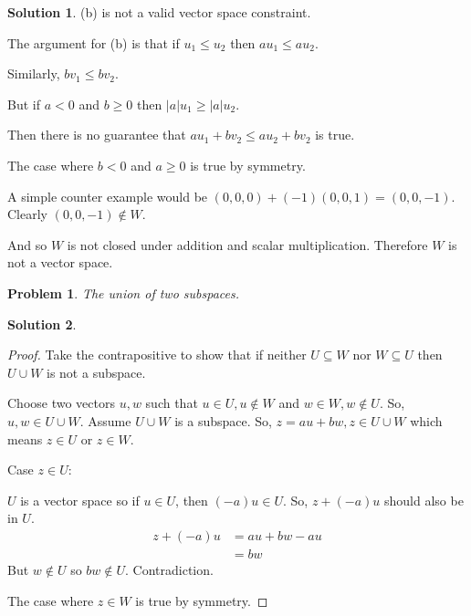\documentclass{article}
\newtheorem{problem}{Problem}
\theoremstyle{definition}
\newtheorem*{solution}{Solution}
\begin{document}
\begin{solution}
(b) is not a valid vector space constraint.

The argument for (b) is that if $u_1\leq u_2$ then $au_1\leq au_2$.

Similarly, $bv_1\leq bv_2$.

But if $a<0$ and $b\geq 0$ then $|a|u_1\geq |a|u_2$.

Then there is no guarantee that $au_1+bv_2\leq au_2+bv_2$ is true.

The case where $b<0$ and $a\geq 0$ is true by symmetry.

A simple counter example would be $(0,0,0)+(-1)(0,0,1)=(0,0,-1)$.
Clearly $(0,0,-1)\notin W$.

And so $W$ is not closed under addition and scalar multiplication.
Therefore $W$ is not a vector space.

\end{solution}

\begin{problem} 

The union of two subspaces.

\end{problem}

\begin{solution}

\begin{proof}
Take the contrapositive to show that if neither $U\subseteq W$ nor $W\subseteq U$ then $U\cup W$ is not a subspace.

Choose two vectors $u,w$ such that $u\in U, u\notin W$ and $w\in W, w\notin U$.
So, $u,w\in U\cup W$.
Assume $U\cup W$ is a subspace.
So, $z=au+bw, z\in U\cup W$ which means $z\in U$ or $z\in W$.

Case $z\in U$:

$U$ is a vector space so if $u\in U$, then $(-a)u\in U$.
So, $z+(-a)u$ should also be in $U$.
\begin{align*}
z+(-a)u&=au+bw-au\\
&=bw
\end{align*}
But $w\notin U$ so $bw\notin U$. Contradiction.

The case where $z\in W$ is true by symmetry.
\end{proof}

\end{solution}
\end{document}
